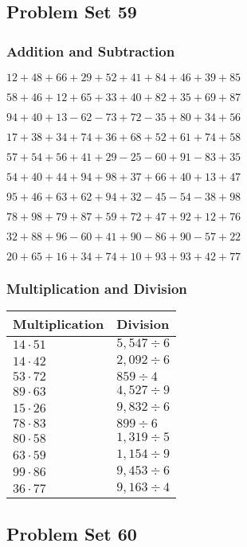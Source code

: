 \hypertarget{problem-set-59}{%
\subsection{Problem Set 59}\label{problem-set-59}}

\hypertarget{addition-and-subtraction-99}{%
\subsubsection{Addition and
Subtraction}\label{addition-and-subtraction-99}}

\(12+48+66+29+52+41+84+46+39+ 85\)

\(58+46+12+65+33+40+82+35+69+87\)

\(94+40+13-62-73+72-35+80+34+56\)

\(17+38+34+74+36+68+52+61+74+58\)

\(57+54+56+41+29-25-60+91-83+35\)

\(54+40+44+94+98+37+66+40+13+47\)

\(95+46+63+62+94+32-45-54-38+98\)

\(78+98+79+87+59+72+47+92+12+76\)

\(32+88+96-60+41+90-86+90-57+22\)

\(20+65+16+34+74+10+93+93+42+77\)

\hypertarget{multiplication-and-division-99}{%
\subsubsection{Multiplication and
Division}\label{multiplication-and-division-99}}

\begin{longtable}[]{@{}ll@{}}
\toprule
Multiplication & Division\tabularnewline
\midrule
\endhead
\(14\cdot51\) & \(5,547÷6\)\tabularnewline
\(14\cdot42\) & \(2,092÷6\)\tabularnewline
\(53\cdot72\) & \(859÷4\)\tabularnewline
\(89\cdot63\) & \(4,527÷9\)\tabularnewline
\(15\cdot26\) & \(9,832÷6\)\tabularnewline
\(78\cdot83\) & \(899÷6\)\tabularnewline
\(80\cdot58\) & \(1,319÷5\)\tabularnewline
\(63\cdot59\) & \(1,154÷9\)\tabularnewline
\(99\cdot86\) & \(9,453÷6\)\tabularnewline
\(36\cdot77\) & \(9,163÷4\)\tabularnewline
\bottomrule
\end{longtable}

\hypertarget{problem-set-60}{%
\subsection{Problem Set 60}\label{problem-set-60}}

